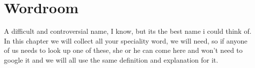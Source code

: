 \section{Wordroom}
A difficult and controversial name, I know, but its the best name i could think of.
\newline
In this chapter we will collect all your speciality word, we will need, so if anyone of us needs to look up one of these, she or he can come here and won't need to google it and we will all use the same definition and explanation for it.
